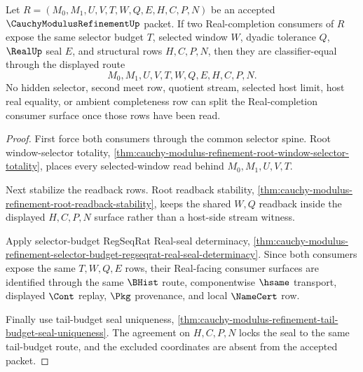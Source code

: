 \begin{theorem}
\label{thm:cauchy-modulus-refinement-tail-budget-selector-lock}
Let $R=(M_0,M_1,U,V,T,W,Q,E,H,C,P,N)$ be an accepted $\CauchyModulusRefinementUp$ packet. If two Real-completion consumers of $R$ expose the same selector budget $T$, selected window $W$, dyadic tolerance $Q$, $\RealUp$ seal $E$, and structural rows $H,C,P,N$, then they are classifier-equal through the displayed route
$$
M_0,M_1,U,V,T,W,Q,E,H,C,P,N.
$$
No hidden selector, second meet row, quotient stream, selected host limit, host real equality, or ambient completeness row can split the Real-completion consumer surface once those rows have been read.
\end{theorem}
\begin{proof}
First force both consumers through the common selector spine. Root window-selector totality, \autoref{thm:cauchy-modulus-refinement-root-window-selector-totality}, places every selected-window read behind $M_0,M_1,U,V,T$.

Next stabilize the readback rows. Root readback stability, \autoref{thm:cauchy-modulus-refinement-root-readback-stability}, keeps the shared $W,Q$ readback inside the displayed $H,C,P,N$ surface rather than a host-side stream witness.

Apply selector-budget RegSeqRat Real-seal determinacy, \autoref{thm:cauchy-modulus-refinement-selector-budget-regseqrat-real-seal-determinacy}. Since both consumers expose the same $T,W,Q,E$ rows, their Real-facing consumer surfaces are identified through the same $\BHist$ route, componentwise $\hsame$ transport, displayed $\Cont$ replay, $\Pkg$ provenance, and local $\NameCert$ row.

Finally use tail-budget seal uniqueness, \autoref{thm:cauchy-modulus-refinement-tail-budget-seal-uniqueness}. The agreement on $H,C,P,N$ locks the seal to the same tail-budget route, and the excluded coordinates are absent from the accepted packet.
\end{proof}

